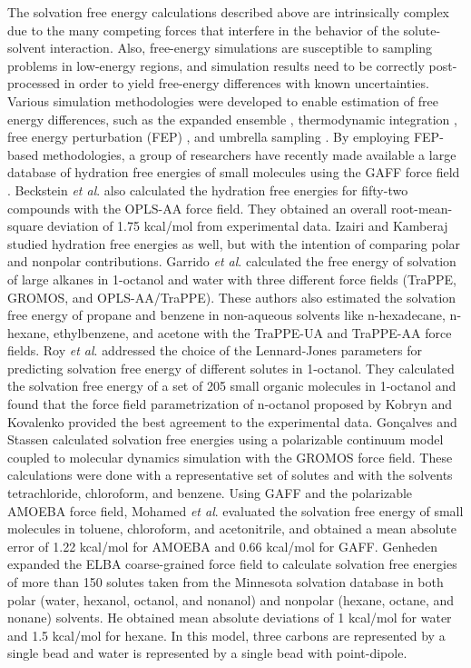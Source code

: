\documentclass[final,12p,times,twocolumn]{elsarticle}
\begin{document}
	The solvation free energy calculations described above are intrinsically complex due to the many competing forces that interfere in the behavior of the solute-solvent interaction. Also, free-energy simulations are susceptible to sampling problems in low-energy regions, and simulation results need to be correctly post-processed in order to yield free-energy differences with known uncertainties. Various simulation methodologies were developed to enable estimation of free energy differences, such as the expanded ensemble \cite{lyubartsev}, thermodynamic integration \cite{kirkwood1935}, free energy perturbation (FEP) \cite{zwanzig1954,bennet1976,mbar}, and umbrella sampling \cite{TORRIE1977187}. By employing FEP-based methodologies, a group of researchers have recently made available a large database of hydration free energies of small molecules using the GAFF force field \cite{PMID:24928188,mobley2017}. Beckstein \textit{et al}. \cite{Beckstein2014} also calculated the hydration free energies for fifty-two compounds with the OPLS-AA force field. They obtained an overall root-mean-square deviation of 1.75 kcal/mol from experimental data. Izairi and Kamberaj \cite{izairi2017} studied hydration free energies as well, but with the intention of comparing polar and nonpolar contributions. Garrido \textit{et al}. \cite{garrido,garrido2011} calculated the free energy of solvation of large alkanes in 1-octanol and water with three different force fields (TraPPE, GROMOS, and OPLS-AA/TraPPE). These authors also estimated the solvation free energy of propane and benzene in non-aqueous solvents like n-hexadecane, n-hexane, ethylbenzene, and acetone with the TraPPE-UA and TraPPE-AA force fields. Roy \textit{et al}. \cite{roy2017} addressed the choice of the Lennard-Jones parameters for predicting solvation free energy of different solutes in 1-octanol. They calculated the solvation free energy of a set of 205 small organic molecules in 1-octanol and found that the force field parametrization of n-octanol proposed by Kobryn and Kovalenko \cite{doi:10.1063/1.2972978} provided the best agreement to the experimental data. Gon\c{c}alves and Stassen \cite{goncalves} calculated solvation free energies using a polarizable continuum model coupled to molecular dynamics simulation with the GROMOS force field. These calculations were done with a representative set of solutes and with the solvents tetrachloride, chloroform, and benzene. Using GAFF and the polarizable AMOEBA \cite{doi:10.1021/ja037005r} force field, Mohamed \textit{et al}. \cite{mohamed2016} evaluated the solvation free energy of small molecules in toluene, chloroform, and acetonitrile, and obtained a mean absolute error of 1.22 kcal/mol for AMOEBA and 0.66 kcal/mol for GAFF. Genheden \cite{doi:10.1021/acs.jctc.5b00963} expanded the ELBA coarse-grained force field \cite{10.1371/journal.pone.0028637} to calculate solvation free energies of more than 150 solutes taken from the Minnesota solvation database \cite{Minnesota} in both polar (water, hexanol, octanol, and nonanol) and nonpolar (hexane, octane, and nonane) solvents. He obtained mean absolute deviations of 1 kcal/mol for water and 1.5 kcal/mol for hexane. In this model, three carbons are represented by a single bead and water is represented by a single bead with point-dipole.
\end{document}
